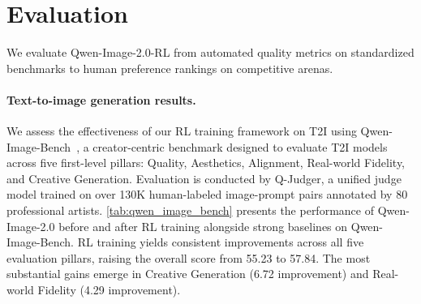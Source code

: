 \documentclass{llmxive}
\begin{document}
\section{Evaluation}
\label{sec:evaluation}

We evaluate Qwen-Image-2.0-RL from automated quality metrics on standardized benchmarks to human preference rankings on competitive arenas.

\paragraph{Text-to-image generation results.} We assess the effectiveness of our RL training framework on T2I using Qwen-Image-Bench~\citep{li2026qwen}, a creator-centric benchmark designed to evaluate T2I models across five first-level pillars: Quality, Aesthetics, Alignment, Real-world Fidelity, and Creative Generation. Evaluation is conducted by Q-Judger, a unified judge model trained on over 130K human-labeled image-prompt pairs annotated by 80 professional artists. 
\cref{tab:qwen_image_bench} presents the performance of Qwen-Image-2.0 before and after RL training alongside strong baselines on Qwen-Image-Bench. RL training yields consistent improvements across all five evaluation pillars, raising the overall score from 55.23 to 57.84. The most substantial gains emerge in Creative Generation (6.72 improvement) and Real-world Fidelity (4.29 improvement).
\end{document}
